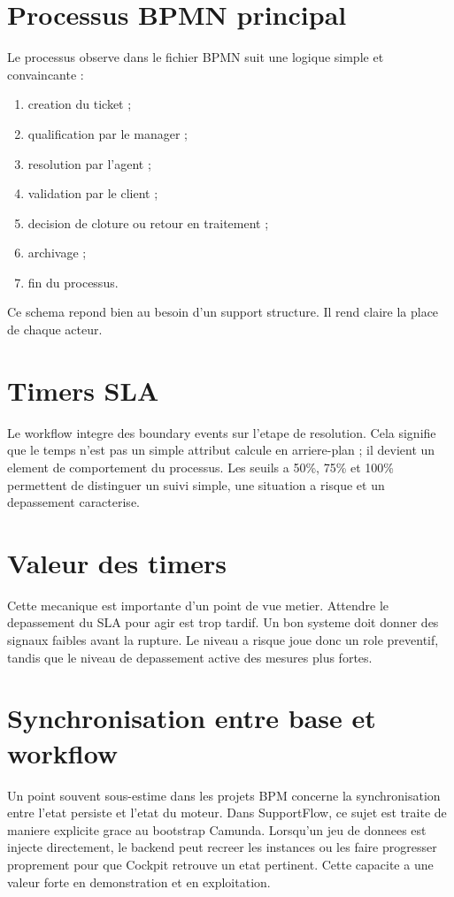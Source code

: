 \documentclass[12pt,a4paper,oneside]{report}
\begin{document}
\section{Processus BPMN principal}

Le processus observe dans le fichier BPMN suit une logique simple et convaincante :

\begin{enumerate}[leftmargin=1.2cm]
  \item creation du ticket ;
  \item qualification par le manager ;
  \item resolution par l'agent ;
  \item validation par le client ;
  \item decision de cloture ou retour en traitement ;
  \item archivage ;
  \item fin du processus.
\end{enumerate}

Ce schema repond bien au besoin d'un support structure. Il rend claire la place de chaque acteur.

\section{Timers SLA}

Le workflow integre des boundary events sur l'etape de resolution. Cela signifie que le temps n'est pas un simple attribut calcule en arriere-plan ; il devient un element de comportement du processus. Les seuils a 50\%, 75\% et 100\% permettent de distinguer un suivi simple, une situation a risque et un depassement caracterise.

\section{Valeur des timers}

Cette mecanique est importante d'un point de vue metier. Attendre le depassement du SLA pour agir est trop tardif. Un bon systeme doit donner des signaux faibles avant la rupture. Le niveau a risque joue donc un role preventif, tandis que le niveau de depassement active des mesures plus fortes.

\section{Synchronisation entre base et workflow}

Un point souvent sous-estime dans les projets BPM concerne la synchronisation entre l'etat persiste et l'etat du moteur. Dans SupportFlow, ce sujet est traite de maniere explicite grace au bootstrap Camunda. Lorsqu'un jeu de donnees est injecte directement, le backend peut recreer les instances ou les faire progresser proprement pour que Cockpit retrouve un etat pertinent. Cette capacite a une valeur forte en demonstration et en exploitation.
\end{document}
